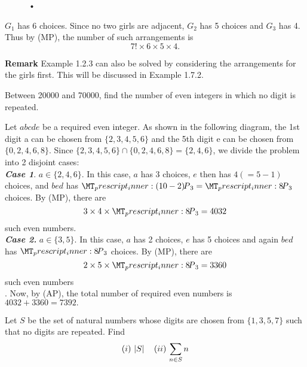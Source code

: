 \documentclass[a4paper,11pt]{book}
\newcommand\perm[2][^n]{\prescript{#1\mkern-2.5mu}{}P_{#2}}
\begin{document}
\begin{soln}
\begin{figure}[h]
\begin{center}
\caption{•}
\end{center}
\end{figure}

$G_1$ has 6 choices. Since no two girls are adjacent, $G_2$ has 5 choices and $G_3$ has 4. Thus by (MP), the number of such arrangements is 
\[7! \times 6 \times 5 \times 4. \] 
\end{soln}
\textbf{Remark} Example 1.2.3 can also be solved by considering the arrangements for the girls first. This will be discussed in Example 1.7.2. 
\begin{example}
Between 20000 and 70000, find the number of even integers in which no digit is repeated. 
\end{example}
\begin{soln}
Let $abcde$ be a required even integer. As shown in the following diagram, the 1st digit a can be chosen from $\{2, 3,4,5, 6\}$ and the 5th digit e can be chosen from $\{0, 2,4,6, 8\}$. 
Since $\{2, 3,4,5, 6\} \cap \{0, 2,4,6, 8\} = \{2, 4, 6\}$, we divide the problem into 2 disjoint cases: \\

\textbf{\textit{ Case 1}}. $a \in \{2, 4, 6\}$. In this case, $a$ has 3 choices, $e$ then has $4(= 5 - 1)$ choices, and $bed$ has $\perm[(10-2)]{3} = \perm[8]{3}$ choices. By (MP), there are 
\[3 \times 4 \times  \perm[8]{3} = 4032 \]
such even numbers. \\

\textbf{\textit{ Case 2.}} $a \in \{3, 5\}$. In this case, $a$ has 2 choices, $e$ has 5 choices and again $bed$ has $\perm[8]{3}$ choices. By (MP), there are 
\[2 \times 5 \times  \perm[8]{3} = 3360\] 
such even numbers\\. 
Now, by (AP), the total number of required even numbers is $4032 + 
3360 = 7392. $
\end{soln}

\begin{example}
Let $S$ be the set of natural numbers whose digits are chosen from $\{1, 3, 5, 7\}$ such that no digits are repeated. Find \\
\[(i)\, \left\lvert S \right\rvert \quad (ii)\, \sum\limits_{n\in S} n\]
\end{example}
\end{document}
